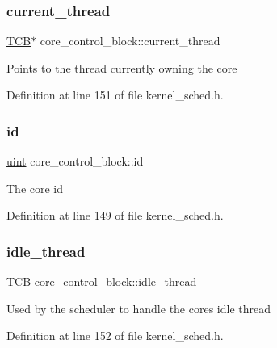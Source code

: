 \subsubsection{\texorpdfstring{current\+\_\+thread}{current\_thread}}
{\footnotesize\ttfamily \hyperlink{structthread__control__block}{T\+CB}$\ast$ core\+\_\+control\+\_\+block\+::current\+\_\+thread}

Points to the thread currently owning the core 

Definition at line 151 of file kernel\+\_\+sched.\+h.

\mbox{\label{structcore__control__block_a5208867f309bdd1656fd473f38b30bfe}} 
\subsubsection{\texorpdfstring{id}{id}}
{\footnotesize\ttfamily \hyperlink{bios_8h_a91ad9478d81a7aaf2593e8d9c3d06a14}{uint} core\+\_\+control\+\_\+block\+::id}

The core id 

Definition at line 149 of file kernel\+\_\+sched.\+h.

\mbox{\label{structcore__control__block_a6dd29dab4a95ce740f45370345408c52}} 
\subsubsection{\texorpdfstring{idle\+\_\+thread}{idle\_thread}}
{\footnotesize\ttfamily \hyperlink{structthread__control__block}{T\+CB} core\+\_\+control\+\_\+block\+::idle\+\_\+thread}

Used by the scheduler to handle the core\textquotesingle{}s idle thread 

Definition at line 152 of file kernel\+\_\+sched.\+h.

\mbox{\label{structcore__control__block_a858cde45d4478d73f60e839594b363f4}} 
